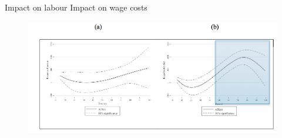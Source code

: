 \documentclass[10pt,handout,xcolor=pdftex,dvipsnames,table]{beamer}
\begin{document}
\begin{frame}{Impact on labour}
Impact on wage costs
\begin{figure}[t]
\centering
\includegraphics[width=1\textwidth]{./Figs/TLCshad.png}
\end{figure}
\end{frame}
\end{document}
